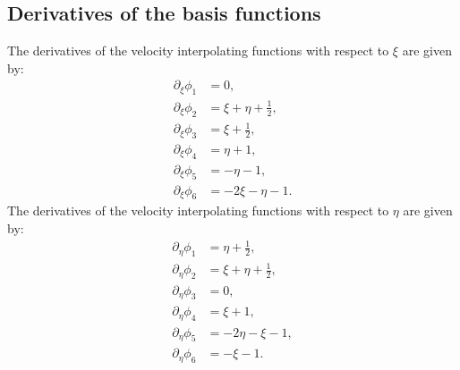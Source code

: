 \documentclass{article}
\begin{document}
\subsection{Derivatives of the basis functions}
The derivatives of the velocity interpolating functions with respect to \(\xi\) are given by:
\begin{align}
\partial_{\xi}\phi_{1} &= 0, \tag{19.13}\\
\partial_{\xi}\phi_{2} &= \xi +\eta +\frac{1}{2}, \tag{19.14}\\
\partial_{\xi}\phi_{3} &= \xi +\frac{1}{2}, \tag{19.15}\\
\partial_{\xi}\phi_{4} &= \eta +1, \tag{19.16}\\
\partial_{\xi}\phi_{5} &= -\eta -1, \tag{19.17}\\
\partial_{\xi}\phi_{6} &= -2\xi -\eta -1. \tag{19.18}
\end{align}
The derivatives of the velocity interpolating functions with respect to \(\eta\) are given by:
\begin{align}
\partial_{\eta}\phi_{1} &= \eta +\frac{1}{2}, \tag{19.19}\\
\partial_{\eta}\phi_{2} &= \xi +\eta +\frac{1}{2}, \tag{19.20}\\
\partial_{\eta}\phi_{3} &= 0, \tag{19.21}\\
\partial_{\eta}\phi_{4} &= \xi +1, \tag{19.22}\\
\partial_{\eta}\phi_{5} &= -2\eta -\xi -1, \tag{19.23}\\
\partial_{\eta}\phi_{6} &= -\xi -1. \tag{19.24}
\end{align}
\end{document}
